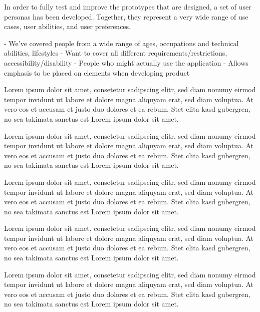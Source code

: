 In order to fully test and improve the prototypes that are designed, a set of
user personas has been developed. Together, they represent a very wide range of
use cases, user abilities, and user preferences.

- We've covered people from a wide range of ages, occupations and technical abilities, lifestyles
- Want to cover all different requirements/restrictions, accessibility/disability
- People who might actually use the application
- Allows emphasis to be placed on elements when developing product

Lorem ipsum dolor sit amet, consetetur sadipscing elitr, sed diam nonumy eirmod
tempor invidunt ut labore et dolore magna aliquyam erat, sed diam voluptua. At
vero eos et accusam et justo duo dolores et ea rebum. Stet clita kasd gubergren,
no sea takimata sanctus est Lorem ipsum dolor sit amet.

Lorem ipsum dolor sit amet, consetetur sadipscing elitr, sed diam nonumy eirmod
tempor invidunt ut labore et dolore magna aliquyam erat, sed diam voluptua. At
vero eos et accusam et justo duo dolores et ea rebum. Stet clita kasd gubergren,
no sea takimata sanctus est Lorem ipsum dolor sit amet.

Lorem ipsum dolor sit amet, consetetur sadipscing elitr, sed diam nonumy eirmod
tempor invidunt ut labore et dolore magna aliquyam erat, sed diam voluptua. At
vero eos et accusam et justo duo dolores et ea rebum. Stet clita kasd gubergren,
no sea takimata sanctus est Lorem ipsum dolor sit amet.

Lorem ipsum dolor sit amet, consetetur sadipscing elitr, sed diam nonumy eirmod
tempor invidunt ut labore et dolore magna aliquyam erat, sed diam voluptua. At
vero eos et accusam et justo duo dolores et ea rebum. Stet clita kasd gubergren,
no sea takimata sanctus est Lorem ipsum dolor sit amet.

Lorem ipsum dolor sit amet, consetetur sadipscing elitr, sed diam nonumy eirmod
tempor invidunt ut labore et dolore magna aliquyam erat, sed diam voluptua. At
vero eos et accusam et justo duo dolores et ea rebum. Stet clita kasd gubergren,
no sea takimata sanctus est Lorem ipsum dolor sit amet.

